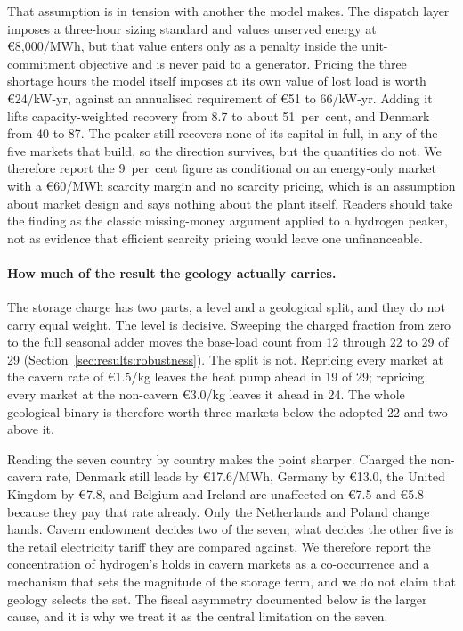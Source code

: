 That assumption is in tension with another the model makes. The dispatch layer imposes a
three-hour sizing standard and values unserved energy at \euro{}8{,}000/MWh, but
that value enters only as a penalty inside the unit-commitment objective and is never
paid to a generator. Pricing the three shortage hours the model itself imposes at its own
value of lost load is worth \euro{}24/kW-yr, against an annualised requirement of
\euro{}51 to 66/kW-yr. Adding it lifts capacity-weighted recovery from 8.7 to about
51~per~cent, and Denmark from 40 to 87. The peaker still recovers none of its capital in full, in any of the five markets that
build, so the direction survives, but the quantities do not.
We therefore report the 9~per~cent figure as conditional on an energy-only market with a
\euro{}60/MWh scarcity margin and no scarcity pricing, which is an assumption about market design and says nothing about the plant itself. Readers should take the
finding as the classic missing-money argument \citep{Joskow2008capacity} applied to a hydrogen peaker, not as evidence that efficient scarcity pricing would leave one
unfinanceable.

\paragraph{How much of the result the geology actually carries.} The storage charge has
two parts, a level and a geological split, and they do not carry equal weight. The level
is decisive. Sweeping the charged fraction from zero to the full seasonal adder moves the
base-load count from 12 through 22 to 29 of 29 (Section~\ref{sec:results:robustness}).
The split is not. Repricing every market at the cavern rate of \euro{}1.5/kg leaves the
heat pump ahead in 19 of 29; repricing every market at the non-cavern \euro{}3.0/kg
leaves it ahead in 24. The whole geological binary is therefore worth three markets
below the adopted 22 and two above it.

Reading the seven country by country makes the point sharper. Charged the non-cavern rate,
Denmark still leads by \euro{}17.6/MWh, Germany by \euro{}13.0, the United Kingdom by
\euro{}7.8, and Belgium and Ireland are unaffected on \euro{}7.5 and \euro{}5.8 because
they pay that rate already.
Only the Netherlands and Poland change hands. Cavern endowment decides two of the seven;
what decides the other five is the retail electricity tariff they are compared against.
We therefore report the concentration of hydrogen's holds in cavern markets as a
co-occurrence and a mechanism that sets the magnitude of the storage term, and we do not
claim that geology selects the set. The fiscal asymmetry documented below is the larger
cause, and it is why we treat it as the central limitation on the seven.

